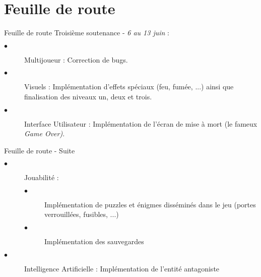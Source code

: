 \section{Feuille de route}

\begin{frame}{Feuille de route}
\setlength{\parindent}{5ex}
Troisième soutenance - \emph{6 au 13 juin} :

\begin{description}
    \item[$\bullet$] Multijoueur : Correction de bugs.
    \item[$\bullet$] Visuels : Implémentation d'effets spéciaux (feu, fumée, ...) ainsi que finalisation des niveaux un, deux et trois.
    \item[$\bullet$] Interface Utilisateur : Implémentation de l'écran de mise à mort (le fameux \emph{Game Over)}.
\end{description}

\end{frame}

\begin{frame}{Feuille de route - Suite}

\begin{description}
        \item[$\bullet$] Jouabilité : 
    \begin{description}
        \item[$\bullet$] Implémentation de puzzles et énigmes disséminés dans le jeu (portes verrouillées, fusibles, ...)
        \item[$\bullet$] Implémentation des sauvegardes
    \end{description}
    \item[$\bullet$] Intelligence Artificielle : Implémentation de l'entité antagoniste
\end{description}

\end{frame}